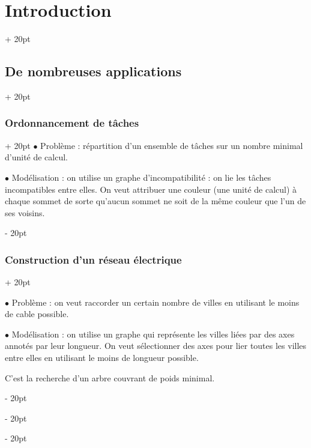 \documentclass[a4paper, 12pt, twoside]{article}
\newcommand{\ind}[1][20pt]{\advance\leftskip + #1}
\newcommand{\deind}[1][20pt]{\advance\leftskip - #1}
\newenvironment{indt}[2][20pt]{#2 \par \ind[#1]}{\par \deind} %
\begin{document}
\begin{indt}{\section{Introduction}}
\begin{indt}{\subsection{De nombreuses applications}}
            \vspace{12pt}
            
            \begin{indt}{\subsubsection{Ordonnancement de tâches}}
                $\bullet$ Problème : répartition d'un ensemble de tâches sur un nombre minimal d'unité de calcul.

                $\bullet$ Modélisation : on utilise un graphe d'incompatibilité : on lie les tâches incompatibles entre elles. On veut attribuer une couleur (une unité de calcul) à chaque sommet de sorte qu'aucun sommet ne soit de la même couleur que l'un de ses voisins.
            \end{indt}

            \vspace{12pt}
            
            \begin{indt}{\subsubsection{Construction d'un réseau électrique}}
                \label{1.2.4}
                
                $\bullet$ Problème : on veut raccorder un certain nombre de villes en utilisant le moins de cable possible.

                $\bullet$ Modélisation : on utilise un graphe qui représente les villes liées par des axes annotés par leur longueur. On veut sélectionner des axes pour lier toutes les villes entre elles en utilisant le moins de longueur possible.

                C'est la recherche d'un arbre couvrant de poids minimal.
            \end{indt}
        \end{indt}
        
    \end{indt}

    \vspace{12pt}
    
\end{document}
